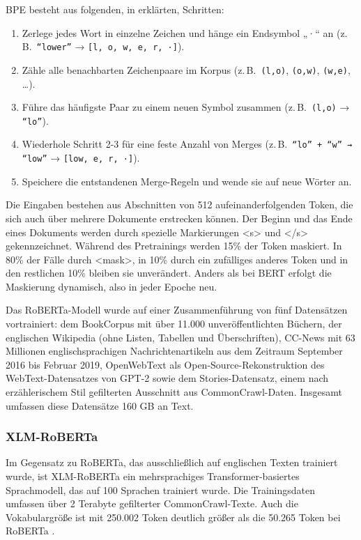 BPE besteht aus folgenden, in \cite{sennrich2015} erklärten, Schritten:
\begin{enumerate}
  \item Zerlege jedes Wort in einzelne Zeichen und hänge ein Endsymbol „·“ an (z.\,B.\ \texttt{``lower''} → \texttt{[l, o, w, e, r, ·]}).
  \item Zähle alle benachbarten Zeichenpaare im Korpus (z.\,B.\ \texttt{(l,o)}, \texttt{(o,w)}, \texttt{(w,e)}, \dots).
  \item Führe das häufigste Paar zu einem neuen Symbol zusammen (z.\,B.\ \texttt{(l,o)} → \texttt{``lo''}).
  \item Wiederhole Schritt 2-3 für eine feste Anzahl von Merges (z.\,B.\ \texttt{``lo'' + ``w'' → ``low''} → \texttt{[low, e, r, ·]}).
  \item Speichere die entstandenen Merge-Regeln und wende sie auf neue Wörter an.
\end{enumerate}

Die Eingaben bestehen aus Abschnitten von 512 aufeinanderfolgenden Token, die sich auch über mehrere Dokumente erstrecken können. 
Der Beginn und das Ende eines Dokuments werden durch spezielle Markierungen <s> und </s> gekennzeichnet. 
Während des Pretrainings werden 15\% der Token maskiert. In 80\% der Fälle durch <mask>, in 10\% durch 
ein zufälliges anderes Token und in den restlichen 10\% bleiben sie unverändert. 
Anders als bei BERT erfolgt die Maskierung dynamisch, also in jeder Epoche neu.

Das RoBERTa-Modell wurde auf einer Zusammenführung von fünf Datensätzen vortrainiert: dem BookCorpus mit über 11.000 
unveröffentlichten Büchern, der englischen Wikipedia (ohne Listen, Tabellen und Überschriften), 
CC-News mit 63 Millionen englischsprachigen Nachrichtenartikeln aus dem Zeitraum September 2016 bis Februar 2019, 
OpenWebText als Open-Source-Rekonstruktion des WebText-Datensatzes von GPT-2 sowie dem Stories-Datensatz, 
einem nach erzählerischem Stil gefilterten Ausschnitt aus CommonCrawl-Daten. Insgesamt umfassen diese Datensätze 160 GB an Text.

\subsubsection{XLM-RoBERTa} \label{sec04:xml_roberta}

Im Gegensatz zu RoBERTa, das ausschließlich auf englischen Texten trainiert wurde, ist XLM-RoBERTa ein mehrsprachiges 
Transformer-basiertes Sprachmodell, das auf 100 Sprachen trainiert wurde. 
Die Trainingsdaten umfassen über 2 Terabyte gefilterter CommonCrawl-Texte.
Auch die Vokabulargröße ist mit 250.002 Token deutlich größer als die 50.265 Token bei RoBERTa \cite{DBLP:journals/corr/abs-1911-02116}.

